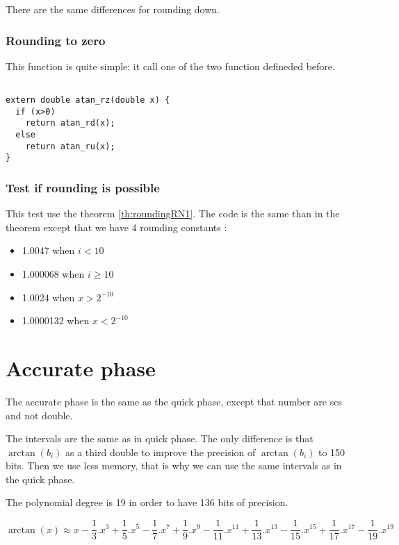 There are the same differences for rounding down.

\subsubsection{Rounding to zero}

This function is quite simple: it call one of the two function defineded
before.

\begin{lstlisting}[caption={Rounding to zero},firstnumber=1]

extern double atan_rz(double x) {
  if (x>0)
    return atan_rd(x);
  else
    return atan_ru(x);
}
\end{lstlisting}

\subsubsection{Test if rounding is possible}
This test use the theorem \ref{th:roundingRN1}.
The code is the same than in the theorem except that we have 4 rounding
constants : 
\begin{itemize}
\item 1.0047 when $i<10$
\item 1.000068 when $i\geq10$
\item 1.0024 when $x>2^{-10}$
\item 1.0000132 when $x<2^{-10}$
\end{itemize}


\section{Accurate phase}
The accurate phase is the same as the quick phase, except that number are
scs and not double.

The intervals are the same as in quick phase. The only difference is that
$\arctan(b_i)$ as a third double to improve the precision of $\arctan(b_i)$ to
150 bits. Then we use less memory, that is why we can use the same
intervals as in the quick phase.

The polynomial degree is 19 in order to have 136 bits of precision.

\begin{equation} \arctan(x) \approx
x-\frac{1}{3}.x^3+\frac{1}{5}.x^5-\frac{1}{7}.x^7+\frac{1}{9}.x^9-\frac{1}{11}.x^{11}+\frac{1}{13}.x^{13}-\frac{1}{15}.x^{15}+\frac{1}{17}.x^{17}-\frac{1}{19}.x^{19}
\label{eq:arctan_scspoly}
\end{equation}

